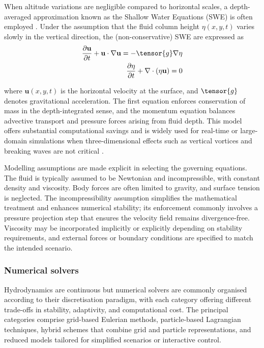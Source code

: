 When altitude variations are negligible compared to horizontal scales, a depth-averaged approximation known as the Shallow Water Equations (SWE) is often employed \cite{Parna2019}. Under the assumption that the fluid column height $\eta(x,y,t)$ varies slowly in the vertical direction, the (non-conservative) SWE are expressed as
\begin{align}
    \frac{\partial \mathbf{u}}{\partial t} + \mathbf{u} \cdot \nabla \mathbf{u} = - \tensor{g} \nabla \eta \\
    \frac{\partial \eta}{\partial t} + \nabla\cdot(\eta \mathbf{u}) = 0
\end{align}

where $\mathbf{u}(x,y,t)$ is the horizontal velocity at the surface, and $\tensor{g}$ denotes gravitational acceleration.
The first equation enforces conservation of mass in the depth-integrated sense, and the momentum equation balances advective transport and pressure forces arising from fluid depth.
This model offers substantial computational savings and is widely used for real-time or large-domain simulations when three-dimensional effects such as vertical vortices and breaking waves are not critical \cite{Parna2019}.

Modelling assumptions are made explicit in selecting the governing equations. The fluid is typically assumed to be Newtonian and incompressible, with constant density and viscosity. Body forces are often limited to gravity, and surface tension is neglected.
The incompressibility assumption simplifies the mathematical treatment and enhances numerical stability; its enforcement commonly involves a pressure projection step that ensures the velocity field remains divergence-free. Viscosity may be incorporated implicitly or explicitly depending on stability requirements, and external forces or boundary conditions are specified to match the intended scenario.

\subsubsection{Numerical solvers}

Hydrodynamics are continuous but numerical solvers are commonly organised according to their discretisation paradigm, with each category offering different trade-offs in stability, adaptivity, and computational cost. The principal categories comprise grid-based Eulerian methods, particle-based Lagrangian techniques, hybrid schemes that combine grid and particle representations, and reduced models tailored for simplified scenarios or interactive control.

